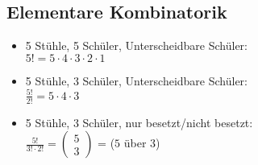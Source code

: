 \subsection{Elementare Kombinatorik}
\label{sec:elemkombinatorik}

\begin{itemize}
    \item 5 Stühle, 5 Schüler, Unterscheidbare Schüler: \\
        $5! = 5 \cdot 4 \cdot 3 \cdot 2 \cdot 1$
    \item 5 Stühle, 3 Schüler, Unterscheidbare Schüler: \\
        $\frac{5!}{2!} = 5 \cdot 4 \cdot 3$
    \item 5 Stühle, 3 Schüler, nur besetzt/nicht besetzt: \\
        $\frac{5!}{3! \cdot 2!} = 
        \begin{pmatrix}
            5 \\ 3
        \end{pmatrix}
        $ =
        ($5$ über $3$)
\end{itemize}

